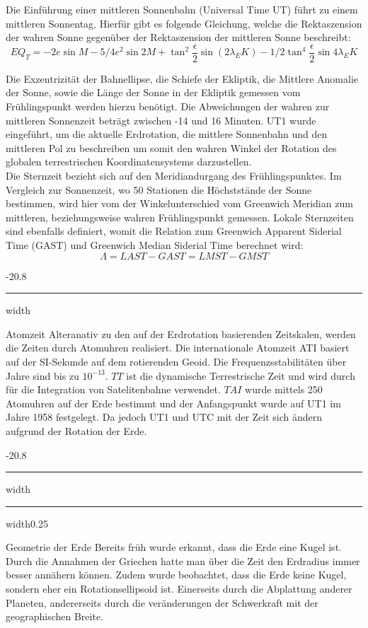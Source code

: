 \documentclass[9pt, landscape, fleqn]{scrartcl}
\makeatletter
\renewcommand{\section}{\@startsection{section}{1}{0mm}%
{-2\baselineskip}{0.8\baselineskip}%
{\hrule depth 0.2pt width\columnwidth\hrule depth1.5pt
width0.25\columnwidth\vspace*{1.2em}\Large\bfseries\rmfamily}}
\renewcommand{\subsubsection}{\@startsection{subsubsection}{1}{0mm}%
{-2\baselineskip}{0.8\baselineskip}%
{\hrule depth 0.2pt width\columnwidth\vspace*{1.2em}\normalsize\bfseries\rmfamily}}
\makeatother
\begin{document}
\begin{multicols*}{3}
Die Einführung einer mittleren Sonnenbahn (Universal Time UT) führt zu einem mittleren Sonnentag. Hierfür gibt es folgende Gleichung, welche die Rektaszension der wahren Sonne gegenüber der Rektaszension der mittleren Sonne beschreibt:
\begin{equation*}
    EQ_T = -2 e \sin M - 5/4 e^2 \sin 2M + \tan^2 \frac{\epsilon}{2} \sin(2\lambda_EK) - 1/2 \tan^4 \frac{\epsilon}{2} \sin 4\lambda_EK
\end{equation*}

Die Exzentrizität der Bahnellipse, die Schiefe der Ekliptik, die Mittlere Anomalie der Sonne, sowie die Länge der Sonne in der Ekliptik gemessen vom Frühlingspunkt werden hierzu benötigt. Die Abweichungen der wahren zur mittleren Sonnenzeit beträgt zwischen -14 und 16 Minuten. UT1 wurde eingeführt, um die aktuelle Erdrotation, die mittlere Sonnenbahn und den mittleren Pol zu beschreiben um somit den wahren Winkel der Rotation des globalen terrestrischen Koordinatensystems darzustellen. \\

Die Sternzeit bezieht sich auf den Meridiandurgang des Frühlingspunktes. Im Vergleich zur Sonnenzeit, wo 50 Stationen die Höchststände der Sonne bestimmen, wird hier vom der Winkelunterschied vom Greenwich Meridian zum mittleren, beziehungsweise wahren Frühlingspunkt gemessen. Lokale Sternzeiten sind ebenfalls definiert, womit die Relation zum Greenwich Apparent Siderial Time (GAST) und Greenwich Median Siderial Time berechnet wird:
\begin{equation*}
    \Lambda = LAST-GAST = LMST - GMST
\end{equation*}
 
\subsubsection{Atomzeit}
Alteranativ zu den auf der Erdrotation basierenden Zeitskalen, werden die Zeiten durch Atomuhren realisiert. Die internationale Atomzeit ATI basiert auf der SI-Sekunde auf dem rotierenden Geoid. Die Frequenzsstabilitäten über Jahre sind bis zu $10^{-13}$. $TT$ ist die dynamische Terrestrische Zeit und wird durch für die Integration von Satelitenbahne verwendet. $TAI$ wurde mittels 250 Atomuhren auf der Erde bestimmt und der Anfangspunkt wurde auf UT1 im Jahre 1958 festgelegt. Da jedoch UT1 und UTC mit der Zeit sich ändern aufgrund der Rotation der Erde.

\section{Geometrie der Erde}
Bereits früh wurde erkannt, dass die Erde eine Kugel ist. Durch die Annahmen der Griechen hatte man über die Zeit den Erdradius immer besser annähern können. Zudem wurde beobachtet, dass die Erde keine Kugel, sondern eher ein Rotationsellipsoid ist. Einerseits durch die Abplattung anderer Planeten,
andererseits durch die veränderungen der Schwerkraft mit der geographischen Breite. 


\end{multicols*}
\end{document}
